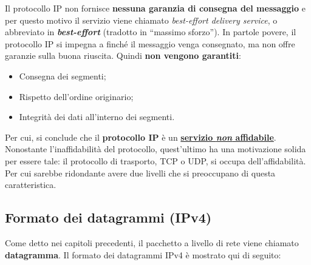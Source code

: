 \documentclass[a4paper]{article}
\newcommand{\dquotes}[1]{``#1''}
\begin{document}
	\noindent
	Il protocollo IP non fornisce \textbf{nessuna garanzia di consegna del messaggio} e per questo motivo il servizio viene chiamato \emph{best-effort delivery service}, o abbreviato in \textbf{\emph{best-effort}} (tradotto in \dquotes{massimo sforzo}). In partole povere, il protocollo IP si impegna a finché il messaggio venga consegnato, ma non offre garanzie sulla buona riuscita. Quindi \textbf{non vengono garantiti}:
	\begin{itemize}
		\item Consegna dei segmenti;
		\item Rispetto dell'ordine originario;
		\item Integrità dei dati all'interno dei segmenti.
	\end{itemize}
	Per cui, si conclude che il \textbf{protocollo IP} è un \underline{\textbf{servizio \emph{non} affidabile}}. Nonostante l'inaffidabilità del protocollo, quest'ultimo ha una motivazione solida per essere tale: il protocollo di trasporto, TCP o UDP, si occupa dell'affidabilità. Per cui sarebbe ridondante avere due livelli che si preoccupano di questa caratteristica.\newpage
	
	\subsection{Formato dei datagrammi (IPv4)}\label{ipv4}
	
	Come detto nei capitoli precedenti, il pacchetto a livello di rete viene chiamato \textcolor{Red3}{\textbf{datagramma}}. Il formato dei datagrammi IPv4 è mostrato qui di seguito:
	
\end{document}
